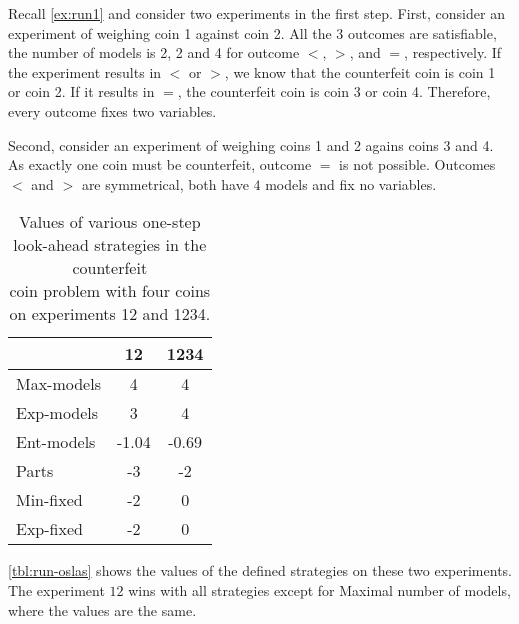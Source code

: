 \begin{example}
Recall \autoref{ex:run1} and consider two experiments in the first step.
First, consider an experiment of weighing coin 1 against coin 2.
All the 3 outcomes are satisfiable, the number of models is
  2, 2 and 4 for outcome $<$, $>$, and $=$, respectively.
If the experiment results in $<$ or $>$, we know that the counterfeit coin
is coin 1 or coin 2. If it results in $=$, the counterfeit coin is coin 3 or coin 4.
Therefore, every outcome fixes two variables.

Second, consider an experiment of weighing coins 1 and 2 agains coins 3 and 4.
As exactly one coin must be counterfeit, outcome $=$ is not possible.
Outcomes $<$ and $>$ are symmetrical, both have $4$ models and fix no variables.

\begin{table}[!ht]
\begin{center}
\begin{tabular}{l|cc}
& 12 & 1234 \\\hline
Max-models & 4 & 4 \\
Exp-models & 3 & 4 \\
Ent-models & -1.04 & -0.69 \\
Parts & -3 & -2 \\
Min-fixed & -2 & 0 \\
Exp-fixed & -2 & 0 \\
\end{tabular}
\caption{Values of various one-step look-ahead strategies in the counterfeit \\
  coin problem with four coins on experiments 12 and 1234.}
\label{tbl:run-oslas}
\end{center}
\end{table}

\autoref{tbl:run-oslas} shows the values of the defined
  strategies on these two experiments.
The experiment $12$ wins with all strategies except for Maximal number of models,
  where the values are the same. \eqed
\end{example}




